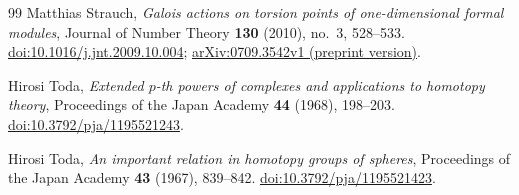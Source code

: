 \documentclass[11pt]{article}
\theoremstyle{definition}
\theoremstyle{remark}
\numberwithin{equation}{section}
\begin{document}
\begin{thebibliography}{99}
Matthias Strauch,
\emph{Galois actions on torsion points of one-dimensional formal modules},
Journal of Number Theory \textbf{130} (2010), no.~3, 528--533.
\href{https://doi.org/10.1016/j.jnt.2009.10.004}{doi:10.1016/j.jnt.2009.10.004};
\href{https://arxiv.org/abs/0709.3542v1}{arXiv:0709.3542v1 (preprint version)}.

Hirosi Toda,
\emph{Extended $p$-th powers of complexes and applications to homotopy theory},
Proceedings of the Japan Academy \textbf{44} (1968), 198--203.
\href{https://doi.org/10.3792/pja/1195521243}{doi:10.3792/pja/1195521243}.

Hirosi Toda,
\emph{An important relation in homotopy groups of spheres},
Proceedings of the Japan Academy \textbf{43} (1967), 839--842.
\href{https://doi.org/10.3792/pja/1195521423}{doi:10.3792/pja/1195521423}.

\end{thebibliography}
\end{document}
